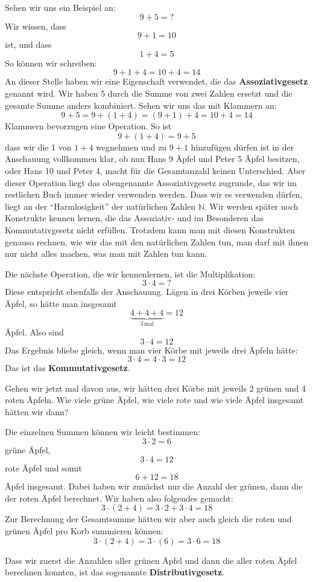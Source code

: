 \noindent Sehen wir uns ein Beispiel an:
\[9+5 = ?\]
Wir wissen, dass 
\[9+1 = 10\]
ist, und dass
\[1+4 = 5\]
So können wir schreiben:
\[9+1+4 = 10 + 4 = 14\]
An dieser Stelle haben wir eine Eigenschaft verwendet, die das \textbf{Assoziativgesetz} genannt wird. Wir haben 5 durch die Summe von zwei Zahlen ersetzt und die gesamte Summe anders kombiniert. Sehen wir uns das mit Klammern an:
\[9+5 = 9+(1+4) = (9+1)+4 = 10+4 = 14\]
Klammern bevorzugen eine Operation. So ist
\[9+(1+4)=9+5\]
dass wir die 1 von $1+4$ wegnehmen und zu $9+1$ hinzufügen dürfen ist in der Anschauung vollkommen klar, ob nun Hans 9 Äpfel und Peter 5 Äpfel besitzen, oder Hans 10 und Peter 4, macht für die Gesamtanzahl keinen Unterschied. Aber dieser Operation liegt das obengenannte Assoziativgesetz zugrunde, das wir im restlichen Buch immer wieder verwenden werden. Dass wir es verwenden dürfen, liegt an der "`Harmlosigkeit"' der natürlichen Zahlen $\mathbb{N}$. Wir werden später noch Konstrukte kennen lernen, die das Assoziativ- und im Besonderen das Kommutativgesetz nicht erfüllen. Trotzdem kann man mit diesen Konstrukten genauso rechnen, wie wir das mit den natürlichen Zahlen tun, man darf mit ihnen nur nicht alles machen, was man mit Zahlen tun kann.

Die nächste Operation, die wir kennenlernen, ist die Multiplikation:
\[3\cdot 4 = ?\]
Diese entspricht ebenfalls der Anschauung. Lägen in drei Körben jeweils vier Äpfel, so hätte man insgesamt
\[\underbrace{4+4+4}_{3 \, \mathrm{mal}} = 12\]
Äpfel. Also sind 
\[3\cdot 4 = 12\]
Das Ergebnis bliebe gleich, wenn man vier Körbe mit jeweils drei Äpfeln hätte:
\[3\cdot 4 = 4\cdot 3 = 12\]
Das ist das \textbf{Kommutativgesetz}.

Gehen wir jetzt mal davon aus, wir hätten drei Körbe mit jeweils 2 grünen und 4 roten Äpfeln. Wie viele grüne Äpfel, wie viele rote und wie viele Äpfel insgesamt hätten wir dann?

Die einzelnen Summen können wir leicht bestimmen: 
\[3\cdot 2 = 6\]
grüne Äpfel,
\[3\cdot 4 = 12 \]
rote Äpfel und somit
\[6+12 = 18\]
Äpfel insgesamt. Dabei haben wir zunächst nur die Anzahl der grünen, dann die der roten Äpfel berechnet. Wir haben also folgendes gemacht:
\[3\cdot (2+4) = 3\cdot 2 + 3\cdot 4 = 18\]
Zur Berechnung der Gesamtsumme hätten wir aber auch gleich die roten und grünen Äpfel pro Korb summieren können:
\[3\cdot (2+4) = 3\cdot (6) = 3\cdot 6 = 18 \]

Dass wir zuerst die Anzahlen aller grünen Äpfel und dann die aller roten Äpfel berechnen konnten, ist das sogenannte \textbf{Distributivgesetz}.

